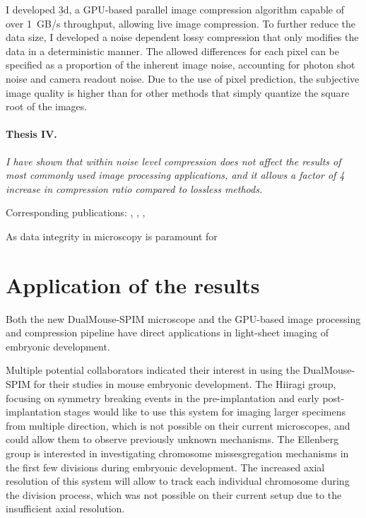     I developed \b3d, a GPU-based parallel image compression algorithm capable of over \SI{1}{GB/s} throughput, allowing live image compression. To further reduce the data size, I developed a noise dependent lossy compression that only modifies the data in a deterministic manner. The allowed differences for each pixel can be specified as a proportion of the inherent image noise, accounting for photon shot noise and camera readout noise. Due to the use of pixel prediction, the subjective image quality is higher than for other methods that simply quantize the square root of the images.

  \paragraph{Thesis IV.} \textit{I have shown that within noise level compression does not affect the results of most commonly used image processing applications, and it allows a factor of 4 increase in compression ratio compared to lossless methods.}
  
    Corresponding publications: \cite{balazs_real-time_2017}, \cite{balazs_gpu-based_2016}, \cite{balazs_gpu-based_2016-1}, \cite{balazs_gpu-based_2017}
    
    As data integrity in microscopy is paramount for 
    


\section{Application of the results}
Both the new DualMouse-SPIM microscope and the GPU-based image processing and compression pipeline have direct applications in light-sheet imaging of embryonic development.

Multiple potential collaborators indicated their interest in using the DualMouse-SPIM for their studies in mouse embryonic development. The Hiiragi group, focusing on symmetry breaking events in the pre-implantation and early post-implantation stages would like to use this system for imaging larger specimens from multiple direction, which is not possible on their current microscopes, and could allow them to observe previously unknown mechanisms. The Ellenberg group is interested in investigating chromosome missesgregation mechanisms in the first few divisions during embryonic development. The increased axial resolution of this system will allow to track each individual chromosome during the division process, which was not possible on their current setup due to the insufficient axial resolution.

